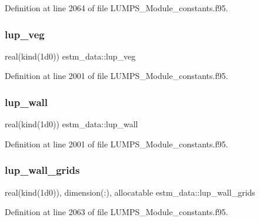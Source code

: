 Definition at line 2064 of file L\+U\+M\+P\+S\+\_\+\+Module\+\_\+constants.\+f95.

\mbox{\label{namespaceestm__data_a94b51266617e7bd1ed54b5f0be2a6041}} 
\subsubsection{\texorpdfstring{lup\+\_\+veg}{lup\_veg}}
{\footnotesize\ttfamily real(kind(1d0)) estm\+\_\+data\+::lup\+\_\+veg}



Definition at line 2001 of file L\+U\+M\+P\+S\+\_\+\+Module\+\_\+constants.\+f95.

\mbox{\label{namespaceestm__data_a96c7c219d9a864a8ca953f76d071846e}} 
\subsubsection{\texorpdfstring{lup\+\_\+wall}{lup\_wall}}
{\footnotesize\ttfamily real(kind(1d0)) estm\+\_\+data\+::lup\+\_\+wall}



Definition at line 2001 of file L\+U\+M\+P\+S\+\_\+\+Module\+\_\+constants.\+f95.

\mbox{\label{namespaceestm__data_aad6c08dce02c049effc5aea3125cd83b}} 
\subsubsection{\texorpdfstring{lup\+\_\+wall\+\_\+grids}{lup\_wall\_grids}}
{\footnotesize\ttfamily real(kind(1d0)), dimension(\+:), allocatable estm\+\_\+data\+::lup\+\_\+wall\+\_\+grids}



Definition at line 2063 of file L\+U\+M\+P\+S\+\_\+\+Module\+\_\+constants.\+f95.

\mbox{\label{namespaceestm__data_af2f45374dbd86a6f4a2a89914e3b17b1}} 
